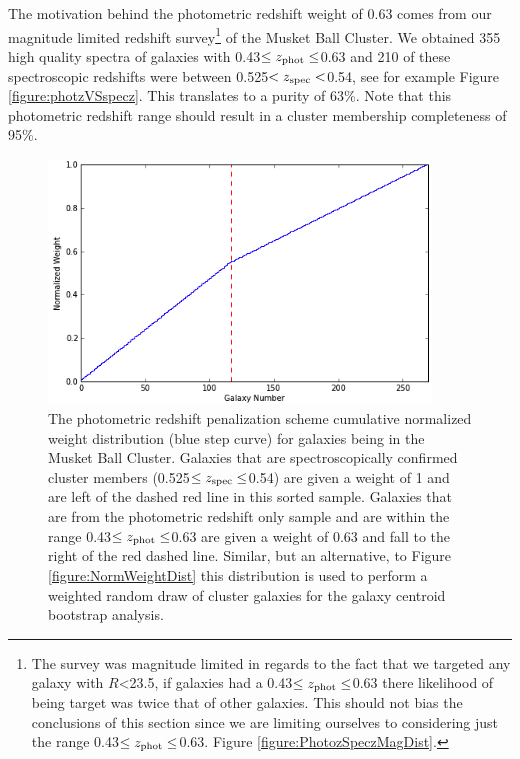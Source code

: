 The motivation behind the photometric redshift weight of 0.63 comes from our magnitude limited redshift survey\footnote{The survey was magnitude limited in regards to the fact that we targeted any galaxy with $R$<23.5, if galaxies had a 0.43$\leq z_{\rm phot} \leq$0.63 there likelihood of being target was twice that of other galaxies. This should not bias the conclusions of this section since we are limiting ourselves to considering just the range 0.43$\leq z_{\rm phot} \leq$0.63. Figure \ref{figure:PhotozSpeczMagDist}.}
of the Musket Ball Cluster.
We obtained 355 high quality spectra of galaxies with 0.43$\leq z_{\rm phot} \leq$0.63 and 210 of these spectroscopic redshifts were between 0.525$<z_{\rm spec}<$0.54, see for example Figure \ref{figure:photzVSspecz}.
This translates to a purity of 63\%.
Note that this photometric redshift range should result in a cluster membership completeness of 95\%.

\begin{figure}
\centering
\includegraphics[width=4in]{Chapter4/AnalysisFiles/cumnormwghtdist_zclip_photozpenalty.png}
\caption[Photometric redshift penalization scheme; cumulative normalized weight distribution for galaxies being in the Musket Ball Cluster.]{
The photometric redshift penalization scheme cumulative normalized weight distribution (blue step curve) for galaxies being in the Musket Ball Cluster. 
Galaxies that are spectroscopically confirmed cluster members (0.525$\leq z_{\rm spec} \leq$0.54) are given a weight of 1 and are left of the dashed red line in this sorted sample.
Galaxies that are from the photometric redshift only sample and are within the range 0.43$\leq z_{\rm phot} \leq$0.63 are given a weight of 0.63 and fall to the right of the red dashed line.
Similar, but an alternative, to Figure \ref{figure:NormWeightDist} this distribution is used to perform a weighted random draw of cluster galaxies for the galaxy centroid bootstrap analysis.
}
\label{figure:NormPenaltyWeightDist}
\end{figure}


